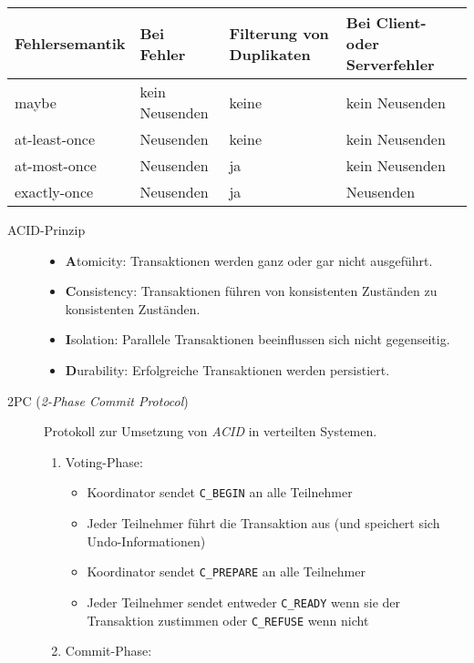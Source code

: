 \documentclass[a4paper]{article}
\begin{document}
\begin{tabular}{l|l|l|l}
    Fehlersemantik & Bei Fehler & Filterung von Duplikaten & Bei Client- oder Serverfehler \\ \hline
    maybe & kein Neusenden & keine & kein Neusenden \\
    at-least-once & Neusenden & keine & kein Neusenden \\
    at-most-once & Neusenden & ja & kein Neusenden \\
    exactly-once & Neusenden & ja & Neusenden
\end{tabular}

\begin{description}
    \item[ACID-Prinzip] \hfill
    \begin{samepage}
    \begin{itemize}
        \item \textbf{A}tomicity: Transaktionen werden ganz oder gar nicht ausgeführt.
        \item \textbf{C}onsistency: Transaktionen führen von konsistenten Zuständen zu konsistenten Zuständen.
        \item \textbf{I}solation: Parallele Transaktionen beeinflussen sich nicht gegenseitig.
        \item \textbf{D}urability: Erfolgreiche Transaktionen werden persistiert.
    \end{itemize}
    \end{samepage}
    \item[2PC (\textit{2-Phase Commit Protocol})]
    \begin{samepage}
    Protokoll zur Umsetzung von \textit{ACID} in verteilten Systemen.
    \begin{enumerate}
        \item Voting-Phase:
        \begin{itemize}
            \item Koordinator sendet \texttt{C\_BEGIN} an alle Teilnehmer
            \item Jeder Teilnehmer führt die Transaktion aus (und speichert sich Undo-Informationen)
            \item Koordinator sendet \texttt{C\_PREPARE} an alle Teilnehmer
            \item Jeder Teilnehmer sendet entweder \texttt{C\_READY} wenn sie der Transaktion zustimmen oder \texttt{C\_REFUSE} wenn nicht
        \end{itemize}
        \item Commit-Phase:

\end{enumerate}
\end{samepage}
\end{description}
\end{document}
